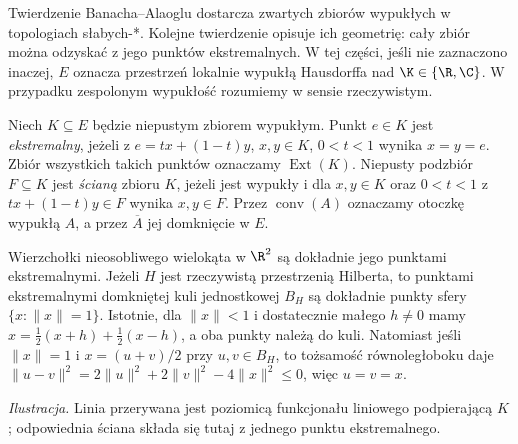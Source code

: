 Twierdzenie Banacha--Alaoglu dostarcza zwartych zbiorów wypukłych
w topologiach słabych-*. Kolejne twierdzenie opisuje ich geometrię:
cały zbiór można odzyskać z jego punktów ekstremalnych. W tej
części, jeśli nie zaznaczono inaczej, $E$ oznacza przestrzeń
lokalnie wypukłą Hausdorffa nad $\K\in\{\R,\C\}$. W przypadku
zespolonym wypukłość rozumiemy w sensie rzeczywistym.

\begin{definicja}
\label{def:extreme-face9}
Niech $K\subseteq E$ będzie niepustym zbiorem wypukłym.
Punkt $e\in K$ jest \emph{ekstremalny}, jeżeli z
$e=tx+(1-t)y$, $x,y\in K$, $0<t<1$ wynika $x=y=e$.
Zbiór wszystkich takich punktów oznaczamy $\operatorname{Ext}(K)$.
Niepusty podzbiór $F\subseteq K$ jest \emph{ścianą} zbioru $K$,
jeżeli jest wypukły i dla $x,y\in K$ oraz $0<t<1$ z
$tx+(1-t)y\in F$ wynika $x,y\in F$.
Przez $\operatorname{conv}(A)$ oznaczamy otoczkę wypukłą $A$,
a przez $\overline A$ jej domknięcie w $E$.
\end{definicja}

\begin{przyklad}
Wierzchołki nieosobliwego wielokąta w $\R^2$ są dokładnie jego
punktami ekstremalnymi. Jeżeli $H$ jest rzeczywistą przestrzenią
Hilberta, to punktami ekstremalnymi domkniętej kuli jednostkowej
$B_H$ są dokładnie punkty sfery $\{x:\|x\|=1\}$.
Istotnie, dla $\|x\|<1$ i dostatecznie małego $h\ne0$
mamy $x=\tfrac12(x+h)+\tfrac12(x-h)$, a oba punkty należą do kuli.
Natomiast jeśli $\|x\|=1$ i $x=(u+v)/2$ przy $u,v\in B_H$,
to tożsamość równoległoboku daje
$\|u-v\|^2=2\|u\|^2+2\|v\|^2-4\|x\|^2\le0$, więc $u=v=x$.
\end{przyklad}

\begin{center}
\end{center}
\noindent
\emph{Ilustracja.} Linia przerywana jest poziomicą funkcjonału
liniowego podpierającą $K$; odpowiednia ściana składa się tutaj
z jednego punktu ekstremalnego.

